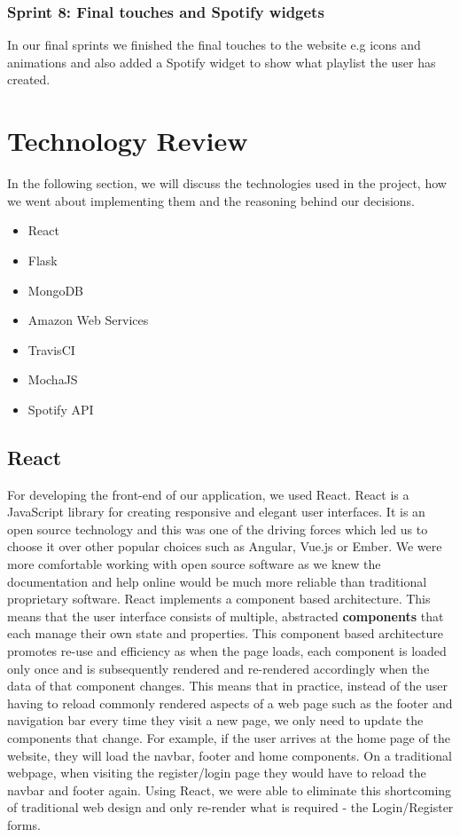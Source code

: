 \subsection{Sprint 8: Final touches and Spotify widgets}
In our final sprints we finished the final touches to the website e.g icons and animations and also added a Spotify widget to show what playlist the user has created.


\chapter{Technology Review}
In the following section, we will discuss the technologies used in the project, how we went about implementing them and the reasoning behind our decisions.

\begin{itemize}
  \item React
  \item Flask
  \item MongoDB
  \item Amazon Web Services
  \item TravisCI
  \item MochaJS
  \item Spotify API
  \end{itemize}

\section{React}
For developing the front-end of our application, we used React. React is a JavaScript library for creating responsive and elegant user interfaces. It is an open source technology and this was one of the 
driving forces which led us to choose it over other popular choices such as Angular, Vue.js or Ember. We were more comfortable working with open source software as we knew the documentation and help online would be much more reliable than traditional proprietary software.
React implements a component based architecture. This means that the user interface consists of multiple, abstracted \textbf{components} that each manage their own state and properties.
This component based architecture promotes re-use and efficiency as when the page loads, each component is loaded only once and is subsequently rendered and re-rendered accordingly when the data of that component changes. This means that in practice, instead of the user having to reload commonly rendered aspects of a web page such as
the footer and navigation bar every time they visit a new page, we only need to update the components that change. For example, if the user arrives at the home page of the website, they will load the navbar, footer and home components. On a traditional webpage, when visiting the register/login page they would have to reload the navbar and footer again. 
Using React, we were able to eliminate this shortcoming of traditional web design and only re-render what is required - the Login/Register forms.

